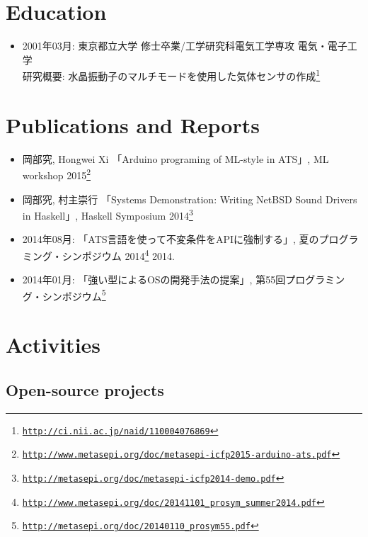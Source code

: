 \documentclass[letterpaper]{article}
\begin{document}
\section*{Education}

\begin{itemize}
  \item 2001年03月: 東京都立大学 修士卒業/工学研究科電気工学専攻 電気・電子工学 \\
    研究概要: 水晶振動子のマルチモードを使用した気体センサの作成\footnote{\href{http://ci.nii.ac.jp/naid/110004076869}{\tt http://ci.nii.ac.jp/naid/110004076869}}
\end{itemize}

\section*{Publications and Reports}

\begin{itemize}
  \item 岡部究, Hongwei Xi 「Arduino programing of ML-style in ATS」, ML workshop 2015\footnote{\href{http://www.metasepi.org/doc/metasepi-icfp2015-arduino-ats.pdf}{\tt http://www.metasepi.org/doc/metasepi-icfp2015-arduino-ats.pdf}}
  \item 岡部究, 村主崇行 「Systems Demonstration: Writing NetBSD Sound Drivers in Haskell」, Haskell Symposium 2014\footnote{\href{http://metasepi.org/doc/metasepi-icfp2014-demo.pdf}{\tt http://metasepi.org/doc/metasepi-icfp2014-demo.pdf}}
  \item 2014年08月: 「ATS言語を使って不変条件をAPIに強制する」, 夏のプログラミング・シンポジウム 2014\footnote{\href{http://www.metasepi.org/doc/20141101\_prosym\_summer2014.pdf}{\tt http://www.metasepi.org/doc/20141101\_prosym\_summer2014.pdf}}  2014.
  \item 2014年01月: 「強い型によるOSの開発手法の提案」, 第55回プログラミング・シンポジウム\footnote{\href{http://metasepi.org/doc/20140110\_prosym55.pdf}{\tt http://metasepi.org/doc/20140110\_prosym55.pdf}}
\end{itemize}

\section*{Activities}

\subsection*{Open-source projects}
\end{document}
